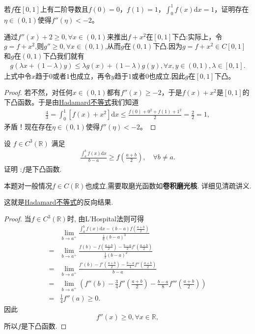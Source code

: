 \documentclass[../../main.tex]{subfiles}
\begin{document}
\begin{example}
若$f$在$[0,1]$上有二阶导数且$f(0) = 0$，$f(1) = 1$，$\int_0^1 f(x)\mathrm{d}x = 1$，证明存在$\eta\in(0,1)$使得$f''(\eta)< -2$。
\end{example}
\begin{remark}
通过$f''(x)+2\geq 0,\forall x\in(0,1)$来推出$f + x^2$在$[0,1]$下凸:实际上，令$g=f+x^2$,则$g''\geq 0,\forall x\in(0,1)$,从而$g$在$(0,1)$下凸.因为$g = f + x^2\in C[0,1]$和$g$在$(0,1)$下凸我们就有
\begin{align*}
g(\lambda x + (1 - \lambda)y)\leq\lambda g(x) + (1 - \lambda)g(y),\forall x,y\in(0,1),\lambda\in[0,1].
\end{align*}
上式中令$x$趋于$0$或者$1$也成立，再令$y$趋于$1$或者$0$也成立.因此$g$在$[0,1]$下凸。 
\end{remark}
\begin{proof}
若不然，对任何$x\in(0,1)$都有$f''(x)\geq -2$，于是$f(x) + x^2$是$[0,1]$的下凸函数。于是由\hyperref[theorem:Hadamard不等式]{Hadamard不等式}我们知道
\begin{align*}
\frac{4}{3}=\int_0^1 [f(x) + x^2]\mathrm{d}x\leq\frac{f(0) + 0^2 + f(1) + 1^2}{2}=\frac{2}{2}=1,
\end{align*}
矛盾！现在存在$\eta\in(0,1)$使得$f''(\eta)< -2$。
\end{proof}

\begin{proposition}
设 \(f\in C^3(\mathbb{R})\) 满足
\begin{align*}
\frac{\int_{a}^{b}f(x)\mathrm{d}x}{b - a} \geqslant f\left(\frac{a + b}{2}\right),\quad \forall b\neq a.
\end{align*}
证明 :\(f\)是下凸函数. 
\end{proposition}
\begin{remark}
本题对一般情况$f\in C(\mathbb{R})$也成立,需要取磨光函数如\textbf{卷积磨光核}. 详细见清疏讲义.
\end{remark}
\begin{note}
这就是\hyperref[theorem:Hadamard不等式]{Hadamard不等式}的反向结果.
\end{note}
\begin{proof}
当\(f\in C^{3}(\mathbb{R})\)时, 由L'Hospital法则可得
\begin{align*}
&\lim_{b\to a^+}\frac{\int_{a}^{b}f(x)\mathrm{d}x - (b - a)f(\frac{a + b}{2})}{\frac{1}{6}(b - a)^3}\\
=&\lim_{b\to a^+}\frac{f(b)-f(\frac{a + b}{2})-\frac{b - a}{2}f'(\frac{a + b}{2})}{\frac{1}{2}(b - a)^2}\\
=&\lim_{b\to a^+}\frac{f'(b)-f'(\frac{a + b}{2})-\frac{b - a}{4}f''(\frac{a + b}{2})}{b - a}\\
=&\lim_{b\to a^+}\left(f''(b)-\frac{3}{4}f''\left(\frac{a + b}{2}\right)-\frac{b - a}{8}f''' \left(\frac{a + b}{2}\right)\right)\\
=&\frac{1}{4}f''(a)\geqslant 0.
\end{align*}
因此
\[f''(x)\geqslant 0,\forall x\in \mathbb{R},\]
所以\(f\)是下凸函数.
\end{proof}
\end{document}
